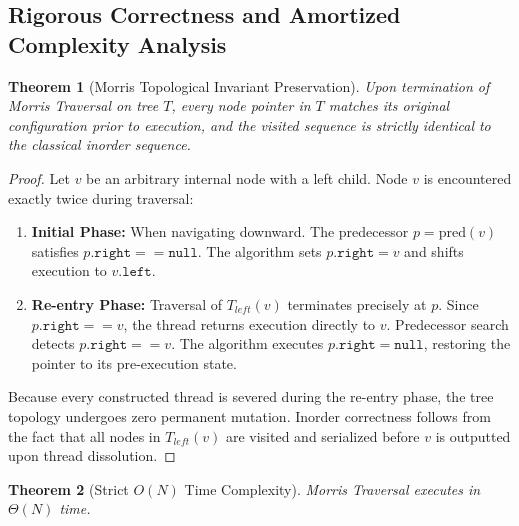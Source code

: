 \documentclass[10pt,twocolumn,letterpaper]{article}
\newtheorem{theorem}{Theorem}
\begin{document}
\subsection{Rigorous Correctness and Amortized Complexity Analysis}

\begin{theorem}[Morris Topological Invariant Preservation]
Upon termination of Morris Traversal on tree $T$, every node pointer in $T$ matches its original configuration prior to execution, and the visited sequence is strictly identical to the classical inorder sequence.
\end{theorem}

\begin{proof}
Let $v$ be an arbitrary internal node with a left child. Node $v$ is encountered exactly twice during traversal:
\begin{enumerate}
    \item \textbf{Initial Phase:} When navigating downward. The predecessor $p = \text{pred}(v)$ satisfies $p.\texttt{right} == \texttt{null}$. The algorithm sets $p.\texttt{right} = v$ and shifts execution to $v.\texttt{left}$.
    \item \textbf{Re-entry Phase:} Traversal of $T_{left}(v)$ terminates precisely at $p$. Since $p.\texttt{right} == v$, the thread returns execution directly to $v$. Predecessor search detects $p.\texttt{right} == v$. The algorithm executes $p.\texttt{right} = \texttt{null}$, restoring the pointer to its pre-execution state.
\end{enumerate}
Because every constructed thread is severed during the re-entry phase, the tree topology undergoes zero permanent mutation. Inorder correctness follows from the fact that all nodes in $T_{left}(v)$ are visited and serialized before $v$ is outputted upon thread dissolution.
\end{proof}

\begin{theorem}[Strict $O(N)$ Time Complexity]
Morris Traversal executes in $\Theta(N)$ time.
\end{theorem}
\end{document}
